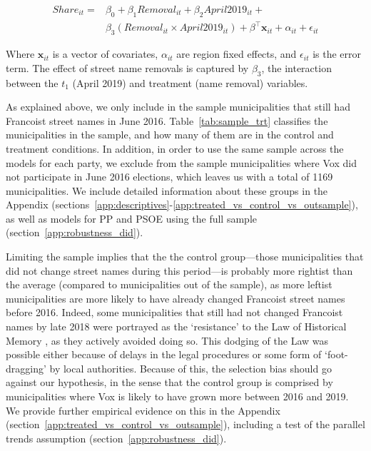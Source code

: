 \documentclass[12pt, notitlepage]{article}
\begin{document}
\begin{equation}
\begin{split}
    Share_{it} =&  \beta_0 + \beta_1 Removal_{it} + \beta_2 April2019_{it} +\\
    &\beta_3 (Removal_{it} \times April2019_{it}) + \beta^\top \mathbf{x}_{it} + \alpha_{it} + \epsilon_{it}
\end{split}
\end{equation}

Where $\mathbf{x}_{it}$ is a vector of covariates, $\alpha_{it}$ are region fixed effects, and $\epsilon_{it}$ is the error term.
The effect of street name removals is captured by $\beta_3$, the interaction between the $t_{1}$ (April 2019) and treatment (name removal) variables.

As explained above, we only include in the sample municipalities that still had Francoist street names in June 2016.
Table~\ref{tab:sample_trt} classifies the municipalities in the sample, and how many of them are in the control and treatment conditions.
In addition, in order to use the same sample across the models for each party, we exclude from the sample municipalities where Vox did not participate in June 2016 elections, which leaves us with a total of 1169 municipalities.
We include detailed information about these groups in the Appendix (sections~\ref{app:descriptives}-\ref{app:treated_vs_control_vs_outsample}), as well as models for PP and PSOE using the full sample (section~\ref{app:robustness_did}).



Limiting the sample implies that the the control group---those municipalities that did not change street names during this period---is probably more rightist than the average (compared to municipalities out of the sample), as more leftist municipalities are more likely to have already changed Francoist street names before 2016.
Indeed, some municipalities that still had not changed Francoist names by late 2018 were portrayed as the `resistance' to the Law of Historical Memory \citep{Blanco-Elipe:2018aa}, as they actively avoided doing so.
This dodging of the Law was possible either because of delays in the legal procedures or some form of `foot-dragging' by local authorities.
Because of this, the selection bias should go against our hypothesis, in the sense that the control group is comprised by municipalities where Vox is likely to have grown more between 2016 and 2019.
We provide further empirical evidence on this in the Appendix (section~\ref{app:treated_vs_control_vs_outsample}), including a test of the parallel trends assumption (section~\ref{app:robustness_did}).
\end{document}
